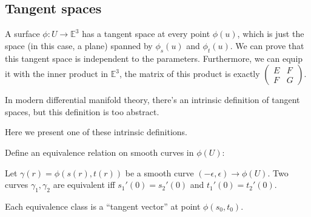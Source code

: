 \subsection{Tangent spaces}
\label{sub:Tangent spaces}

A surface $\phi:U\to \mathbb{E}^3$ has a tangent space at every point $\phi(u)$,
which is just the space (in this case, a plane) spanned by $\phi_s(u)$ and $\phi_t(u)$.
We can prove that this tangent space is independent to the parameters.
Furthermore, we can equip it with the inner product in $\mathbb{E}^3$,
the matrix of this product is exactly $\begin{pmatrix}
	E &F \\ F &G
\end{pmatrix}$.

\begin{remark}
    In modern differential manifold theory, there's an intrinsic definition of
	tangent spaces, but this definition is too abstract.
\end{remark}

Here we present one of these intrinsic definitions.
\begin{definition}
	Define an equivalence relation on smooth curves in $\phi(U)$:

	Let $\gamma(r) = \phi(s(r),t(r))$ be
	a smooth curve $(-\epsilon,\epsilon)\to \phi(U)$.
	Two curves $\gamma_1,\gamma_2$ are equivalent
	iff $s_1'(0)=s_2'(0)$ and $t_1'(0)=t_2'(0)$.

	Each equivalence class is a ``tangent vector'' at point $\phi(s_0,t_0)$.
\end{definition}
